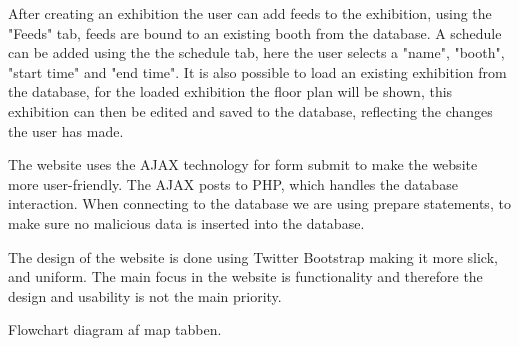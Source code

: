 After creating an exhibition the user can add feeds to the exhibition, using the "Feeds" tab, feeds are bound to an existing booth from the database. A schedule can be added using the the schedule tab, here the user selects a "name", "booth", "start time" and "end time".
It is also possible to load an existing exhibition from the database, for the loaded exhibition the floor plan will be shown, this exhibition can then be edited and saved to the database, reflecting the changes the user has made.


The website uses the AJAX technology for form submit to make the website more user-friendly. The AJAX posts to PHP, which handles the database interaction. When connecting to the database we are using prepare statements, to make sure no malicious data is inserted into the database.


The design of the website is done using Twitter Bootstrap making it more slick, and uniform.
The main focus in the website is functionality and therefore the design and usability is not the main priority.




Flowchart diagram af map tabben.